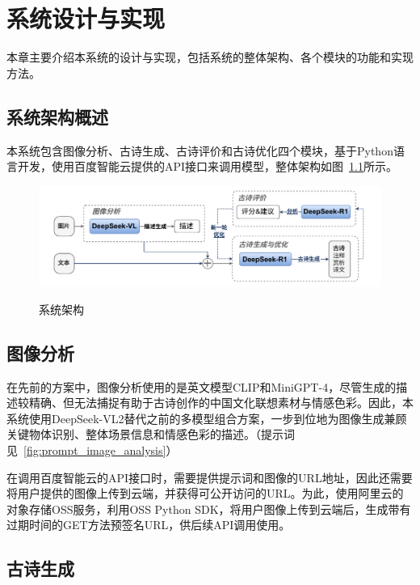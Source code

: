 
\chapter{系统设计与实现}

本章主要介绍本系统的设计与实现，包括系统的整体架构、各个模块的功能和实现方法。

\section{系统架构概述}
本系统包含图像分析、古诗生成、古诗评价和古诗优化四个模块，基于Python语言开发，使用百度智能云提供的API接口来调用模型，整体架构如图~\ref{fig:system_architecture}所示。

\begin{figure}[h]
    \centering
    \includegraphics[width=1\textwidth]
    {figures/系统架构.pdf}\\
    \caption{系统架构}
    \label{fig:system_architecture}
  \end{figure}

\section{图像分析}

在先前的方案中，图像分析使用的是英文模型CLIP和MiniGPT-4，尽管生成的描述较精确、但无法捕捉有助于古诗创作的中国文化联想素材与情感色彩。因此，本系统使用DeepSeek-VL2\cite{wuDeepSeekVL2MixtureofExpertsVisionLanguage2024}替代之前的多模型组合方案，一步到位地为图像生成兼顾关键物体识别、整体场景信息和情感色彩的描述。（提示词见~\ref{fig:prompt_image_analysis}）

在调用百度智能云的API接口时，需要提供提示词和图像的URL地址，因此还需要将用户提供的图像上传到云端，并获得可公开访问的URL。为此，使用阿里云的对象存储OSS服务，利用OSS Python SDK，将用户图像上传到云端后，生成带有过期时间的GET方法预签名URL，供后续API调用使用。

\section{古诗生成}

